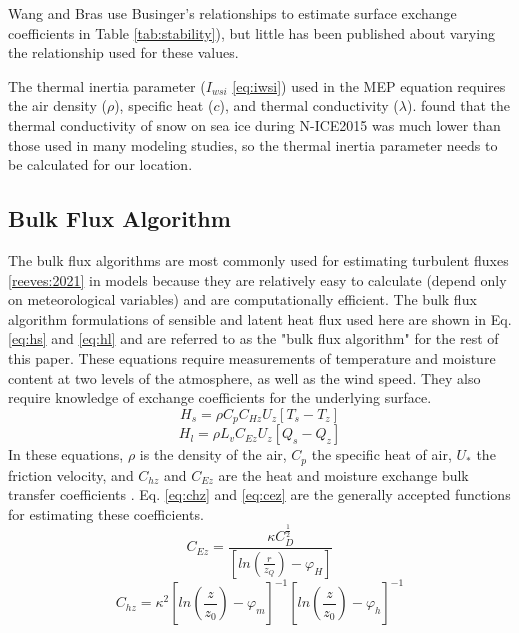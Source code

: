 Wang and Bras \citep{wang:2009} use Businger's relationships \citep{businger:1971} to estimate surface exchange coefficients in Table \ref{tab:stability}), but little has been published about varying the relationship used for these values. 

The thermal inertia parameter ($I_{wsi}$ \ref{eq:iwsi}) used in the MEP equation requires the air density ($\rho$), specific heat ($c$), and thermal conductivity ($\lambda$). \citet{merkouriadi:2017} found that the thermal conductivity of snow on sea ice during N-ICE2015 was much lower than those used in many modeling studies, so the thermal inertia parameter needs to be calculated for our location. 

\subsection{Bulk Flux Algorithm}
The bulk flux algorithms are most commonly used for estimating turbulent fluxes \ref{reeves:2021} in models because they are relatively easy to calculate (depend only on meteorological variables) and are computationally efficient. The bulk flux algorithm formulations of sensible and latent heat flux used here are shown in Eq. \ref{eq:hs} and \ref{eq:hl} and are referred to as the "bulk flux algorithm" for the rest of this paper. These equations require measurements of temperature and moisture content at two levels of the atmosphere, as well as the wind speed. They also require knowledge of exchange coefficients for the underlying surface.
\begin{equation}\label{eq:hs}
H_{s} = \rho C_{p} C_{Hz} U_{z} [T_{s} - T_{z}]
\end{equation}
\begin{equation}\label{eq:hl}
H_{l} = \rho L_{v} C_{Ez} U_{z} [Q_{s} - Q_{z}] 
\end{equation}
In these equations, $\rho$ is the density of the air, $C_{p}$ the specific heat of air, $U_{*}$ the friction velocity, and $C_{hz}$ and $C_{Ez}$ are the heat and moisture exchange bulk transfer coefficients \citep{foken:2008, andreas:311}. Eq. \ref{eq:chz} and \ref{eq:cez} are the generally accepted functions for estimating these coefficients. 
\begin{equation}\label{eq:cez}
C_{Ez} = \frac{\kappa C_{D}^{\frac{1}{2}}}{[ln(\frac{r}{z_{Q}})-\varphi_{H}]}
\end{equation}
\begin{equation}\label{eq:chz}
C_{hz} =  \kappa^{2} \left[ ln \left( \frac{z}{z_{0}} \right) - \varphi_{m} \right] ^{-1} \left[ ln \left( \frac{z}{z_{0}} \right) - \varphi_{h} \right] ^{-1}
\end{equation}


